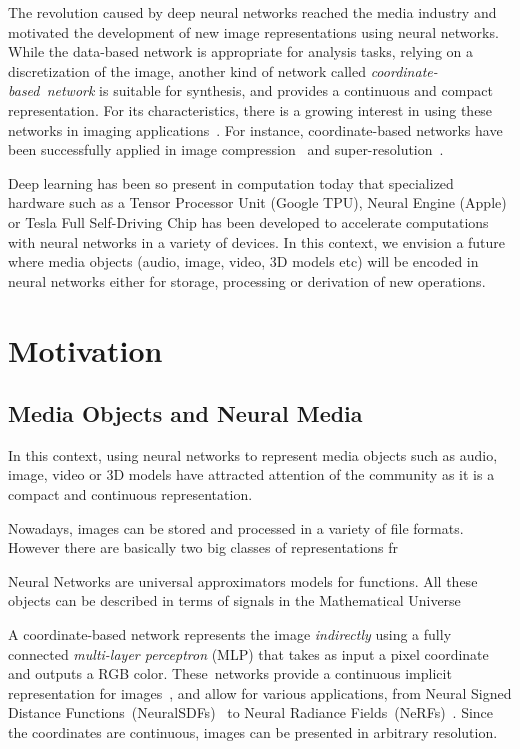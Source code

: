 The revolution caused by deep neural networks reached the media industry and motivated the development of new image representations using neural networks. While the data-based network is appropriate for analysis tasks, relying on a discretization of the image, another kind of network called \textit{coordinate-based~network} is suitable for synthesis, and provides a continuous and compact representation. For its characteristics, there is a growing interest in using these networks in imaging applications~\cite{xie2022neural}. For instance, coordinate-based networks have been successfully applied in image compression~\cite{dupont2021coin} and super-resolution~\cite{czerkawski2021neural}.

Deep learning has been so present in computation today that specialized hardware such as a Tensor Processor Unit (Google TPU), Neural Engine (Apple) or Tesla Full Self-Driving Chip has been developed to accelerate computations with neural networks in a variety of devices. In this context, we envision a future where media objects (audio, image, video, 3D models etc) will be encoded in neural networks either for storage, processing or derivation of new operations.

\section{Motivation}

\subsection{Media Objects and Neural Media}

In this context, using neural networks to represent media objects such as audio, image, video or 3D models have attracted attention of the community as it is a compact and continuous representation. 

Nowadays, images can be stored and processed in a variety of file formats. However there are basically two big classes of representations fr

Neural Networks are universal approximators models for functions. All these objects can be described in terms of signals in the Mathematical Universe

A coordinate-based network represents the image \emph{indirectly} using a fully connected \textit{multi-layer perceptron} (MLP) that takes as input a pixel coordinate and outputs a RGB color. These~networks provide a continuous implicit representation for images~\cite{chen2021learning}, and allow for various applications, from Neural Signed Distance Functions~(NeuralSDFs)~\cite{park2019deepsdf} to Neural Radiance Fields~(NeRFs)~\cite{2020nerf}. Since the coordinates are continuous, images can be presented in arbitrary resolution.


